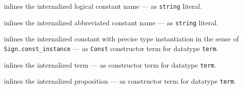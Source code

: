 \begin{isabellebody}
\begin{isamarkuptext}
  \begin{description}

  \item {} inlines the internalized logical
  constant name  --- as \verb|string| literal.

  \item {} inlines the internalized
  abbreviated constant name  --- as \verb|string|
  literal.

  \item {} inlines the internalized
  constant  with precise type instantiation in the sense of
  \verb|Sign.const_instance| --- as \verb|Const| constructor term for
  datatype \verb|term|.

  \item {} inlines the internalized term 
  --- as constructor term for datatype \verb|term|.

  \item {} inlines the internalized proposition
   --- as constructor term for datatype \verb|term|.


\end{description}
\end{isamarkuptext}
\end{isabellebody}
